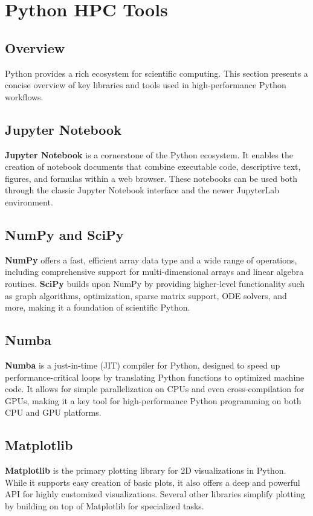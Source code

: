 \documentclass[11pt,a4paper]{book}
\begin{document}
\chapter{Python HPC Tools}

\section*{Overview}
Python provides a rich ecosystem for scientific computing. This section presents a concise overview of key libraries and tools used in high-performance Python workflows.

\section{Jupyter Notebook}
\textbf{Jupyter Notebook} is a cornerstone of the Python ecosystem. It enables the creation of notebook documents that combine executable code, descriptive text, figures, and formulas within a web browser. These notebooks can be used both through the classic Jupyter Notebook interface and the newer JupyterLab environment.

\section{NumPy and SciPy}
\textbf{NumPy} offers a fast, efficient array data type and a wide range of operations, including comprehensive support for multi-dimensional arrays and linear algebra routines.  
\textbf{SciPy} builds upon NumPy by providing higher-level functionality such as graph algorithms, optimization, sparse matrix support, ODE solvers, and more, making it a foundation of scientific Python.

\section{Numba}
\textbf{Numba} is a just-in-time (JIT) compiler for Python, designed to speed up performance-critical loops by translating Python functions to optimized machine code. It allows for simple parallelization on CPUs and even cross-compilation for GPUs, making it a key tool for high-performance Python programming on both CPU and GPU platforms.

\section{Matplotlib}
\textbf{Matplotlib} is the primary plotting library for 2D visualizations in Python. While it supports easy creation of basic plots, it also offers a deep and powerful API for highly customized visualizations. Several other libraries simplify plotting by building on top of Matplotlib for specialized tasks.
\end{document}
